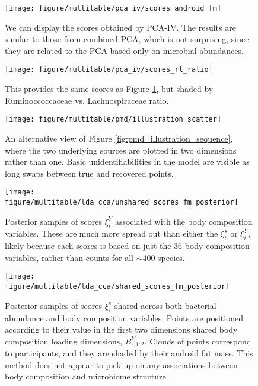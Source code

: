 \begin{figure}
  \centering
  \texttt{[image: figure/multitable/pca\_iv/scores\_android\_fm]}
  \caption{We can display the scores obtained by PCA-IV. The results are similar
    to those from combined-PCA, which is not surprising, since they are related
    to the PCA based only on microbial
    abundances. \label{fig:pca_iv_scores_android_fm} }
\end{figure}

\begin{figure}
  \centering
  \texttt{[image: figure/multitable/pca\_iv/scores\_rl\_ratio]}
  \caption{This provides the same scores as Figure
    \ref{fig:pca_iv_scores_android_fm}, but shaded by Ruminoccoccaceae vs.
    Lachnospiraceae ratio. \label{fig:pca_iv_scores_rl_ratio} }
\end{figure}

\begin{figure}
  \centering
  \texttt{[image: figure/multitable/pmd/illustration\_scatter]}
  \caption{An alternative view of Figure \ref{fig:pmd_illustration_sequence},
    where the two underlying sources are plotted in two dimensions rather than
    one. Basic unidentifiabilities in the model are visible as long swaps
    between true and recovered points. \label{fig:pmd_illustration_scatter} }
\end{figure}

 \begin{figure}
   \centering
   \texttt{[image: figure/multitable/lda\_cca/unshared\_scores\_fm\_posterior]}
   \caption{Posterior samples of scores $\xi^{Y}_i$ associated with the body
     composition variables. These are much more spread out than either the
     $\xi_{i}^s$ or $\xi_{i}^Y$, likely because each scores is based on just the
     36 body composition variables, rather than counts for all $\sim 400$
     species.
     \label{fig:lda_cca_unshared_scores_fm_posterior} }
 \end{figure}

 \begin{figure}
   \centering
   \texttt{[image: figure/multitable/lda\_cca/shared\_scores\_fm\_posterior]}
   \caption{Posterior samples of scores $\xi^{s}_i$ shared across both bacterial
     abundance and body composition variables. Points are positioned according
     to their value in the first two dimensions shared body composition loading
     dimensions, $B^{Y}_{\cdot, 1:2}$. Clouds of points correspond to
     participants, and they are shaded by their android fat mass. This method
     does not appear to pick up on any associations between body composition and
     microbiome structure.
 \label{fig:lda_cca_shared_scores_fm_posterior} }
 \end{figure}

